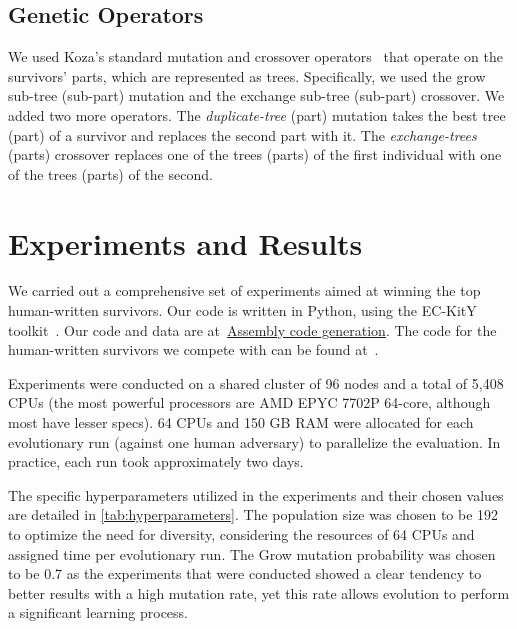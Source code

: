 \documentclass[dvipsnames, format=sigconf]{acmart}
\begin{document}
\subsection{Genetic Operators}
\label{sec:method:operators}
We used Koza's standard mutation and crossover operators~\cite{koza1994genetic} that operate on the survivors' parts, which are represented as trees.
Specifically, we used the grow sub-tree (\ie sub-part) mutation and the exchange sub-tree (sub-part) crossover.
We added two more operators. The \textit{duplicate-tree} (part) mutation takes the best tree (part) of a survivor and replaces the second part with it. The \textit{exchange-trees} (parts) crossover replaces one of the trees (parts) of the first individual with one of the trees (parts) of the second.

\section{Experiments and Results}
\label{sec:results}
We carried out a comprehensive set of experiments aimed at winning the top human-written survivors. Our code is written in Python, using the EC-KitY toolkit~\cite{Sipper2023ECKity}. Our code and data are at~\href{https://github.com/irenamal/EC-KitY/tree/assembly_code_generation}{Assembly code generation}. 
The code for the human-written survivors we compete with can be found at~\cite{codeguru_repo}.

Experiments were conducted on a shared cluster of 96 nodes and a total of 5,408 CPUs (the most powerful processors are AMD EPYC 7702P 64-core, although most have lesser specs). 64 CPUs and 150 GB RAM were allocated for each evolutionary run (against one human adversary) to parallelize the evaluation. In practice, each run took approximately two days. 

The specific hyperparameters utilized in the experiments and their chosen values are detailed in \autoref{tab:hyperparameters}. The population size was chosen to be 192 to optimize the need for diversity, considering the resources of 64 CPUs and assigned time per evolutionary run. The Grow mutation probability was chosen to be 0.7 as the experiments that were conducted showed a clear tendency to better results with a high mutation rate, yet this rate allows evolution to perform a significant learning process. 
\end{document}
